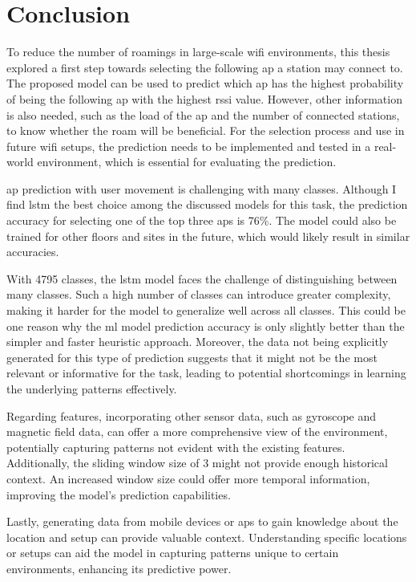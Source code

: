 \chapter{Conclusion}\label{ch:conclusion}
 
To reduce the number of roamings in large-scale \ac{wifi} environments, this thesis explored a first step towards selecting the following \ac{ap} a station may connect to.
The proposed model can be used to predict which \ac{ap} has the highest probability of being the following \ac{ap} with the highest \ac{rssi} value. However, other information is also needed, such as the load of the \ac{ap} and the number of connected stations, to know whether the roam will be beneficial.
For the selection process and use in future \ac{wifi} setups, the prediction needs to be implemented and tested in a real-world environment, which is essential for evaluating the prediction.

\ac{ap} prediction with user movement is challenging with many classes.
Although I find \ac{lstm} the best choice among the discussed models for this task, the prediction accuracy for selecting one of the top three \acp{ap} is 76\%.
The model could also be trained for other floors and sites in the future, which would likely result in similar accuracies.

With 4795 classes, the \ac{lstm} model faces the challenge of distinguishing between many classes.
Such a high number of classes can introduce greater complexity, making it harder for the model to generalize well across all classes.
This could be one reason why the \ac{ml} model prediction accuracy is only slightly better than the simpler and faster heuristic approach.
Moreover, the data not being explicitly generated for this type of prediction suggests that it might not be the most relevant or informative for the task, leading to potential shortcomings in learning the underlying patterns effectively.

Regarding features, incorporating other sensor data, such as gyroscope and magnetic field data, can offer a more comprehensive view of the environment, potentially capturing patterns not evident with the existing features.
Additionally, the sliding window size of 3 might not provide enough historical context. An increased window size could offer more temporal information, improving the model's prediction capabilities.

Lastly, generating data from mobile devices or \acp{ap} to gain knowledge about the location and setup can provide valuable context.
Understanding specific locations or setups can aid the model in capturing patterns unique to certain environments, enhancing its predictive power.
